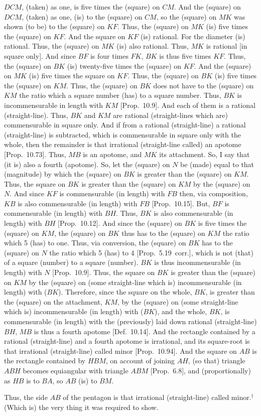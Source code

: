 \begin{Parallel}{}{}
{$DCM$, (taken) as one, is five times the (square) on $CM$.
And the (square) on $DCM$, (taken) as one,  (is)  to the (square) on $CM$, so the (square) on $MK$ was shown (to be) to the (square) on 
$KF$.  Thus, the (square) on $MK$ (is) five times the (square) on 
$KF$. And the square on $KF$ (is) rational. For the diameter
(is) rational. Thus, the (square) on $MK$ (is) also rational. 
Thus, $MK$ is rational [in square only]. And since $BF$ is four times
$FK$, $BK$ is thus five times $KF$. Thus, the (square) on $BK$
(is) twenty-five times the (square) on $KF$.  And the (square) on $MK$
(is) five times the square on $KF$. Thus, the (square) on $BK$ (is) five
times the (square) on $KM$.  Thus, the (square) on $BK$ does not
have to the (square) on $KM$ the ratio which a square number (has) to
a square number. Thus, $BK$ is incommensurable in length with $KM$ [Prop.~10.9].
And each of them is a rational (straight-line).  Thus, $BK$ and $KM$ are rational
(straight-lines which are) commensurable in square only. And if from a rational (straight-line)
a rational (straight-line) is subtracted, which is commensurable in square
only with the whole, then the remainder is that irrational (straight-line
called) an apotome [Prop.~10.73]. Thus, $MB$ is an apotome, and $MK$ its attachment. So, I say that (it is) also a fourth (apotome). So, let the
(square) on $N$ be (made) equal to that (magnitude) by which the (square)
on $BK$ is greater than the (square) on $KM$. Thus, the
square on $BK$ is greater than the (square) on $KM$ by the (square) on $N$.
And since $KF$ is commensurable (in length) with $FB$ then, via composition, 
$KB$ is also commensurable (in length) with $FB$ [Prop.~10.15]. But, $BF$ is commensurable (in length)
with $BH$. Thus, $BK$ is also commensurable (in length) with $BH$ [Prop.~10.12]. And since the
(square) on $BK$ is five times the (square) on $KM$, the (square) on $BK$
thus has to the (square) on $KM$ the ratio which 5 (has) to one. Thus, via
conversion, the (square) on $BK$ has to the (square) on $N$ the ratio
which 5 (has) to 4 [Prop.~5.19~corr.], which is not (that) of a
square (number) to a square (number). $BK$ is thus incommensurable (in length)
with $N$ [Prop.~10.9]. Thus, the square on $BK$ is greater than
the (square) on $KM$ by the (square) on (some straight-line which is) incommensurable (in length) with ($BK$). Therefore, since the square on the whole,
$BK$, is greater than the (square) on the attachment, $KM$, by the
(square) on (some straight-line which is) incommensurable (in length) with ($BK$),
and the whole, $BK$, is commensurable (in length) with the (previously) laid down
rational (straight-line) $BH$, $MB$ is thus a fourth apotome
[Def.~10.14]. And the rectangle contained by a rational (straight-line)
and a fourth apotome is irrational, and its square-root is that irrational
(straight-line) called minor [Prop.~10.94]. And the square on $AB$
is the rectangle contained by $HBM$, on account of joining $AH$, (so that)
triangle $ABH$ becomes equiangular  with triangle $ABM$ [Prop.~6.8], and (proportionally) as
$HB$ is to $BA$, so $AB$ (is) to $BM$.

Thus, the side $AB$ of the pentagon is that irrational (straight-line)
called minor.$^\dag$ (Which is) the very thing it was required to show.}
\end{Parallel}
